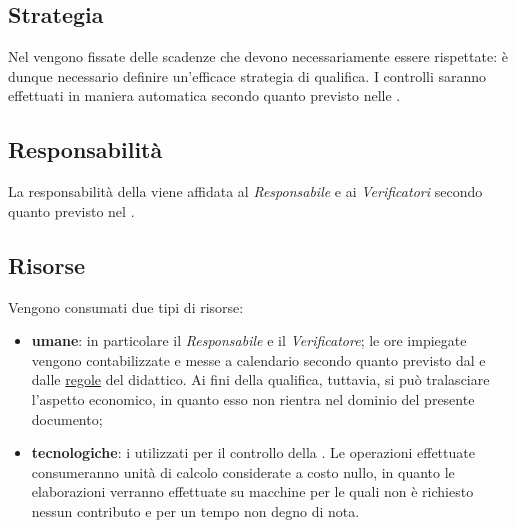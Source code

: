 \subsection{Strategia}
Nel \PianoDiProgetto vengono fissate delle scadenze che devono necessariamente essere rispettate: è dunque necessario definire un'efficace strategia di qualifica. I controlli saranno effettuati in maniera automatica secondo quanto previsto nelle \NormeDiProgetto. 

\subsection{Responsabilità}
La responsabilità della  viene affidata al \textit{Responsabile} e ai \textit{Verificatori} secondo quanto previsto nel \PianoDiProgetto.

\subsection{Risorse}
Vengono consumati due tipi di risorse:
\begin{itemize}
	\item \textbf{umane}: in particolare il \textit{Responsabile} e il \textit{Verificatore}; le ore impiegate vengono contabilizzate e messe a calendario secondo quanto previsto dal \PianoDiProgetto e dalle \href{http://www.math.unipd.it/~tullio/IS-1/2015/Dispense/PD01.pdf}{regole} del  didattico. Ai fini della qualifica, tuttavia, si può tralasciare l'aspetto economico, in quanto esso non rientra nel dominio del presente documento;
		\item \textbf{tecnologiche}: i  utilizzati per il controllo della . Le operazioni effettuate  consumeranno unità di calcolo considerate a costo nullo, in quanto le elaborazioni verranno effettuate su macchine per le quali non è richiesto nessun contributo e per un tempo non degno di nota.
\end{itemize}
